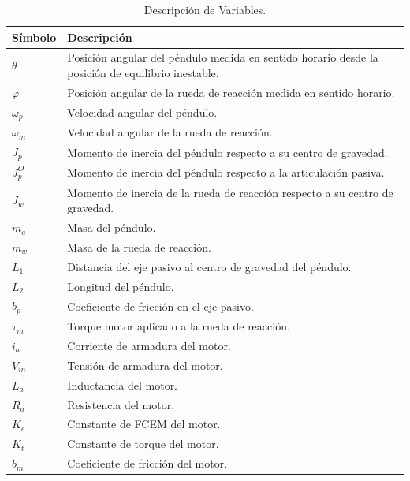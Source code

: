 \documentclass{article}
\begin{document}
\begin{table}[h!]
    \begin{center}
        \caption{Descripción de Variables.}
        \label{tab:tabla1}
        \begin{tabular}{l|l}
        \toprule
        \textbf{Símbolo} & \textbf{Descripción}\\
        \midrule
        $\theta$ & Posición angular del péndulo medida en sentido horario desde la posición de equilibrio inestable.\\
        $\varphi$ & Posición angular de la rueda de reacción medida en sentido horario.\\
        $\omega_p$ & Velocidad angular del péndulo.\\
        $\omega_m$ & Velocidad angular de la rueda de reacción.\\

        $J_p$ & Momento de inercia del péndulo respecto a su centro de gravedad.\\
        $J_p^O$ & Momento de inercia del péndulo respecto a la articulación pasiva.\\
        $J_w$ & Momento de inercia de la rueda de reacción respecto a su centro de gravedad.\\
        $m_a$ & Masa del péndulo.\\
        $m_w$ & Masa de la rueda de reacción.\\
        $L_1$ & Distancia del eje pasivo al centro de gravedad del péndulo.\\
        $L_2$ & Longitud del péndulo.\\
        $b_p$ & Coeficiente de fricción en el eje pasivo.\\
        $\tau_m$ & Torque motor aplicado a la rueda de reacción.\\

        $i_a$ & Corriente de armadura del motor.\\
        $V_{in}$ & Tensión de armadura del motor.\\
        $L_a$ & Inductancia del motor.\\
        $R_a$ & Resistencia del motor.\\
        $K_e$ & Constante de FCEM del motor.\\
        $K_t$ & Constante de torque del motor.\\
        $b_m$ & Coeficiente de fricción del motor.\\
        \bottomrule

        \end{tabular}
    \end{center}
\end{table}
\newpage
\end{document}
